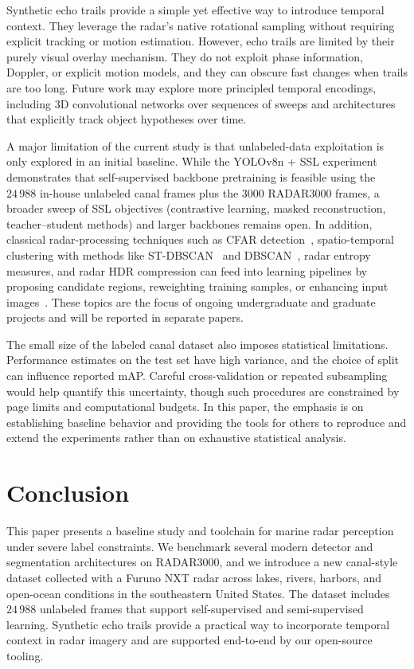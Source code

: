 \documentclass[twocolumn, 10pt]{article}
\begin{document}
Synthetic echo trails provide a simple yet effective way to introduce temporal context. They leverage the radar's native rotational sampling without requiring explicit tracking or motion estimation. However, echo trails are limited by their purely visual overlay mechanism. They do not exploit phase information, Doppler, or explicit motion models, and they can obscure fast changes when trails are too long. Future work may explore more principled temporal encodings, including 3D convolutional networks over sequences of sweeps and architectures that explicitly track object hypotheses over time.

A major limitation of the current study is that unlabeled-data exploitation is only explored in an initial baseline. While the YOLOv8n + SSL experiment demonstrates that self-supervised backbone pretraining is feasible using the $24\,988$ in-house unlabeled canal frames plus the $3000$ RADAR3000 frames, a broader sweep of SSL objectives (contrastive learning, masked reconstruction, teacher--student methods) and larger backbones remains open. In addition, classical radar-processing techniques such as CFAR detection~\cite{rashid2025cfar_sar_vessels}, spatio-temporal clustering with methods like ST-DBSCAN~\cite{birant2007st_dbscan} and DBSCAN~\cite{ester1996dbscan}, radar entropy measures, and radar HDR compression can feed into learning pipelines by proposing candidate regions, reweighting training samples, or enhancing input images~\cite{richards2014fundamentals_radar_signal_processing}. These topics are the focus of ongoing undergraduate and graduate projects and will be reported in separate papers.

The small size of the labeled canal dataset also imposes statistical limitations. Performance estimates on the test set have high variance, and the choice of split can influence reported mAP. Careful cross-validation or repeated subsampling would help quantify this uncertainty, though such procedures are constrained by page limits and computational budgets. In this paper, the emphasis is on establishing baseline behavior and providing the tools for others to reproduce and extend the experiments rather than on exhaustive statistical analysis.

\section{Conclusion}
\label{sec:conclusion}
This paper presents a baseline study and toolchain for marine radar perception under severe label constraints. We benchmark several modern detector and segmentation architectures on RADAR3000, and we introduce a new canal-style dataset collected with a Furuno NXT radar across lakes, rivers, harbors, and open-ocean conditions in the southeastern United States. The dataset includes $24\,988$ unlabeled frames that support self-supervised and semi-supervised learning. Synthetic echo trails provide a practical way to incorporate temporal context in radar imagery and are supported end-to-end by our open-source tooling.
\end{document}
